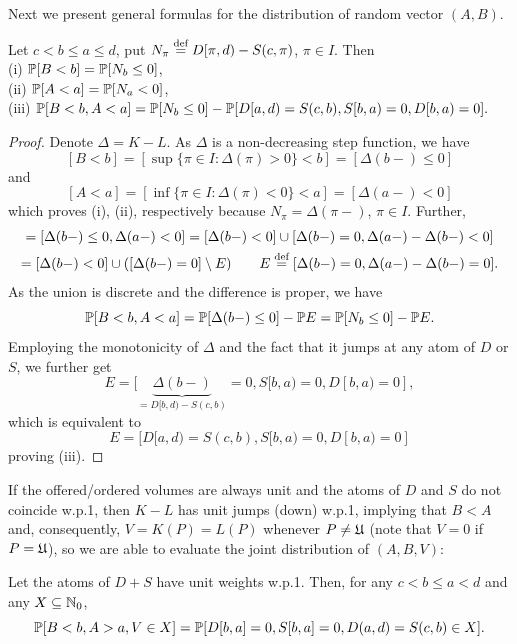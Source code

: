 \documentclass{aptpub}
\begin{document}
\noindent Next we present general formulas for the distribution of random vector $(A,B)$. 

\begin{proposition} \label{th:gen} Let $c<b\leq a \leq d$, put $N_\pi \defined D[\pi,d)-S(c,\pi)$, $\pi \in I$. Then\\
(i) $\P[B<b] = \P[N_b \leq 0]$,\\
(ii)  $\P[A<a] = \P[N_a < 0]$,\\
(iii) $\P[B<b,A<a]=\P[N_b\leq 0]-\P[D[a,d)=S(c,b),S[b,a)=0,D[b,a)=0].$\\
\end{proposition}

\begin{proof} Denote $\Delta = K-L$. As $\Delta$ is a non-decreasing step function, we have
$$[B<b] = [\sup\{\pi\in I:\Delta(\pi)>0\} < b] = [\Delta(b-)\leq 0]$$
and
$$
[A<a] = [\inf\{\pi\in I:\Delta(\pi)< 0 \} < a]
= [\Delta(a-)< 0] 
$$
which proves (i), (ii), respectively because $N_\pi=\Delta(\pi-)$, $\pi \in I$. Further,
\begin{multline*} 
[B<b,A<a] = [\Delta(b-)\leq 0,\Delta(a-)< 0] = [\Delta(b-) < 0] \cup [\Delta(b-) = 0, \Delta(a-)-\Delta(b-) < 0]
\\
=[\Delta(b-) < 0] \cup ( [\Delta(b-) = 0] \setminus E)
\qquad E \defined [\Delta(b-) = 0,\Delta(a-)-\Delta(b-) = 0].
\end{multline*}
As the union is discrete and the difference is proper, we have
$$
\P[B<b,A<a] = \P[\Delta(b-)\leq 0]-\P E = \P[N_b\leq 0]-\P E.
$$
Employing the monotonicity of $\Delta$ and the fact that it jumps at any atom of $D$ or $S$,  we further get
$$
E = [\underbrace{\Delta(b-)}_{=D[b,d)-S(c,b)}=0,S[b,a) = 0, D[b,a)=0], 
$$
which is equivalent to
$$
E=[D[a,d)=S(c,b),S[b,a)=0,D[b,a)=0]
$$
proving (iii).
\end{proof}


\noindent If the offered/ordered volumes are always unit and the atoms of $D$ and $S$ do not coincide w.p.1, then  $K-L$ has unit jumps (down) w.p.1, implying that $B < A$ and, consequently, $V=K(P)=L(P)$ whenever $P\neq \undef$ (note that $V=0$ if $P=\undef$), so we are able to evaluate the joint distribution of $(A,B,V)$:

\begin{proposition} \label{th:general} Let the atoms of $D+S$ have unit weights w.p.1. Then, for any $c< b \leq a < d$ and any $X \subseteq \N_0$,
\begin{equation}
\P[B<b,A>a,V\in X]=\P[ D[b,a] = 0, S[b,a] = 0, D(a,d)=S(c,b)\in X].
\label{eq:pbax}
\end{equation}
\end{proposition}
\end{document}
